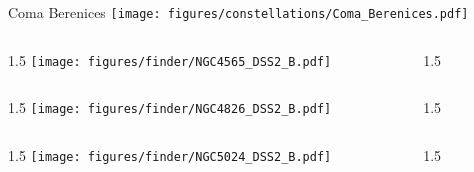 \documentclass[final]{beamer}
\newlength{\colwidth}
\begin{document}

\begin{frame}[t]{\LARGE Coma Berenices}
    \centering
    \texttt{[image: figures/constellations/Coma\_Berenices.pdf]}
\end{frame}


\begin{frame}[t]{}
    \begin{columns}[T]
        \begin{column}{1.5\colwidth}
            \centering
            \texttt{[image: figures/finder/NGC4565\_DSS2\_B.pdf]}
        \end{column}
        \begin{column}{1.5\colwidth}
            \Large
            
        \end{column}
    \end{columns}
    \vspace{\fill}
    \begin{columns}[T]
        \begin{column}{1.5\colwidth}
            \centering
            \texttt{[image: figures/finder/NGC4826\_DSS2\_B.pdf]}
        \end{column}
        \begin{column}{1.5\colwidth}
            \Large
            
        \end{column}
    \end{columns}
\end{frame}


\begin{frame}[t]{}
    \begin{columns}[T]
        \begin{column}{1.5\colwidth}
            \centering
            \texttt{[image: figures/finder/NGC5024\_DSS2\_B.pdf]}
        \end{column}
        \begin{column}{1.5\colwidth}
            \Large
            
        \end{column}
    \end{columns}
    \vspace{\fill}
\end{frame}
\end{document}
